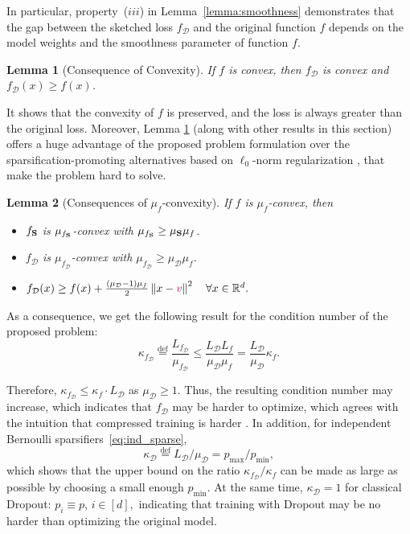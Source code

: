 \documentclass{article}
\newcommand{\shift}{{\color{purple}s}}
\newcommand{\bb}{\mathbb}
\newcommand{\R}{\bb R}
\newcommand{\norm}[1]{\left\| #1 \right\|}
\newcommand{\cD}{\mathcal{D}}
\newcommand{\eqdef}{\stackrel{\text{def}}{=}}
\newtheorem{lemma}{Lemma}
\theoremstyle{plain}
\newcommand{\tf}{f_{\mathcal{D}}}
\renewcommand{\shift}{{\color{purple}v}}
\newcommand{\mS}{{\bf S}}
\theoremstyle{plain}
\theoremstyle{definition}
\theoremstyle{remark}
\begin{document}
In particular, property~($iii$) in Lemma~\ref{lemma:smoothness} demonstrates that the gap between the sketched loss $\tf$ and the original function $f$ depends on the model weights and the smoothness parameter of function $f$.

\begin{lemma}[Consequence of Convexity] \label{lem:convex-only}
	If $f$ is convex, then $\tf$ is convex and $\tf(x)\geq f(x)$.
\end{lemma}
It shows that the convexity of $f$ is preserved, and the  loss is always greater than the original loss.
Moreover, Lemma \ref{lem:convex-only} (along with other results in this section) offers a huge advantage of the proposed problem formulation over the sparsification-promoting alternatives based on $\ell_0$-norm regularization \citep{louizos2018learning, peste2021ac}, that make the problem hard to solve.

\begin{lemma}[Consequences of $\mu_f$-convexity] \label{lemma:consequences_strongly_convex}
	If $f$ is $\mu_f$-convex, then
	\begin{itemize}
		\item[(i)] $f_{\mS}$ is $\mu_{f_\mS}$-convex with $\mu_{f_\mS} \geq \mu_{\mS} \mu_f $.

		\item[(ii)] $\tf$ is $\mu_{\tf}$-convex with $\mu_{\tf} \geq \mu_{\mathcal{D}} \mu_f $.

		\item[(iii)] $\tf(x) \geq f(x) + \frac{ (\mu_{\mathcal{D}}-1) \mu_f}{2} \norm{x-\shift}^2 \quad  \forall x\in \R^d.$
	\end{itemize}
\end{lemma}

As a consequence, we get the following result for the condition number of the proposed problem:
\begin{equation}
	\kappa_{\tf} \eqdef \frac{L_{\tf}}{\mu_{\tf}} \leq
	\frac{L_{\mathcal{D}} L_f}{\mu_{\mathcal{D}} \mu_f} =
	\frac{L_{\mathcal{D}}}{\mu_{\mathcal{D}}} \kappa_f.
\end{equation}

Therefore, $\kappa_{\tf} \leq \kappa_f \cdot L_{\cD}$
as $\mu_{\mathcal{D}} \geq 1$. Thus, the resulting condition number may increase, which indicates that $\tf$ may be harder to optimize, which agrees with the intuition that compressed training is harder \citep{evci2019difficulty}. In addition, for independent Bernoulli sparsifiers~\eqref{eq:ind_sparse},
\begin{equation}
    \kappa_{\mathcal{D}} \eqdef L_{\mathcal{D}}/ \mu_{\mathcal{D}} = p_{\max}/p_{\min},
\end{equation}
which shows that the upper bound on the ratio $\kappa_{\tf} / \kappa_f $ can be made as large as possible by choosing a small enough $p_{\min}$. At the same time, $\kappa_{\cD} = 1$ for classical Dropout: $p_i \equiv p$, $i\in[d],$ indicating that training with Dropout may be no harder than optimizing the original model.
\end{document}
